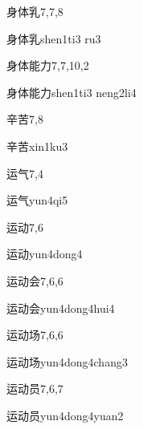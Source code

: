 \begin{entry}{身体乳}{7,7,8}
  \begin{phonetics}{身体乳}{shen1ti3 ru3}
  \end{phonetics}
\end{entry}

\begin{entry}{身体能力}{7,7,10,2}
  \begin{phonetics}{身体能力}{shen1ti3 neng2li4}
  \end{phonetics}
\end{entry}

\begin{entry}{辛苦}{7,8}
  \begin{phonetics}{辛苦}{xin1ku3}
  \end{phonetics}
\end{entry}

\begin{entry}{运气}{7,4}
  \begin{phonetics}{运气}{yun4qi5}
  \end{phonetics}
\end{entry}

\begin{entry}{运动}{7,6}
  \begin{phonetics}{运动}{yun4dong4}
  \end{phonetics}
\end{entry}

\begin{entry}{运动会}{7,6,6}
  \begin{phonetics}{运动会}{yun4dong4hui4}
  \end{phonetics}
\end{entry}

\begin{entry}{运动场}{7,6,6}
  \begin{phonetics}{运动场}{yun4dong4chang3}
  \end{phonetics}
\end{entry}

\begin{entry}{运动员}{7,6,7}
  \begin{phonetics}{运动员}{yun4dong4yuan2}
  \end{phonetics}
\end{entry}

